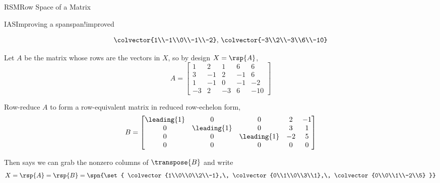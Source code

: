 \begin{subsect}{RSM}{Row Space of a Matrix}
\begin{example}{IAS}{Improving a span}{span!improved}
\begin{para}
\begin{equation*}
{{\colvector{1\\-1\\0\\-1\\-2},\,
\colvector{-3\\2\\-3\\6\\-10}
}}
\end{equation*}\end{para}
%
\begin{para}Let $A$ be the matrix whose rows are the vectors in $X$, so by design $X=\rsp{A}$,
%
\begin{equation*}
A=
\begin{bmatrix}
1 & 2 & 1 & 6 & 6\\
3 & -1 & 2 & -1 & 6\\
1 & -1 & 0 & -1 & -2\\
-3 & 2 & -3 & 6 & -10
\end{bmatrix}
\end{equation*}
\end{para}
%
\begin{para}Row-reduce $A$ to form a row-equivalent matrix in reduced row-echelon form,
%
\begin{equation*}
B=
\begin{bmatrix}
\leading{1} & 0 & 0 & 2 & -1\\
0 & \leading{1} & 0 & 3 & 1\\
0 & 0 & \leading{1} & -2 & 5\\
0 & 0 & 0 & 0 & 0
\end{bmatrix}
\end{equation*}
\end{para}
%
\begin{para}Then  says we can grab the nonzero columns of $\transpose{B}$ and write
%
\begin{equation*}
X=\rsp{A}=\rsp{B}=
\spn{\set{
\colvector{1\\0\\0\\2\\-1},\,
\colvector{0\\1\\0\\3\\1},\,
\colvector{0\\0\\1\\-2\\5}
}}
\end{equation*}

\end{para}
\end{example}
\end{subsect}
